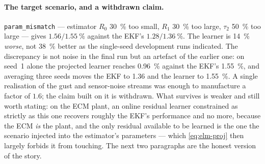 \paragraph{The target scenario, and a withdrawn claim.}  \texttt{param\_mismatch} --- estimator
$R_0$ \SI{30}{\percent} too small, $R_1$ \SI{30}{\percent} too large, $\tau_2$ \SI{50}{\percent} too
large --- gives $1.56/\SI{1.55}{\percent}$ against the EKF's $1.28/\SI{1.36}{\percent}$.  The
learner is \SI{14}{\percent} \emph{worse}, not \SI{38}{\percent} better as the single-seed
development runs indicated.  The discrepancy is not noise in the final run but an artefact of the
earlier one: on seed~1 alone the projected learner reaches \SI{0.96}{\percent} against the EKF's
\SI{1.55}{\percent}, and averaging three seeds moves the EKF to \SI{1.36}{} and the learner to
\SI{1.55}{\percent}.  A single realisation of the gust and sensor-noise streams was enough to
manufacture a factor of $1.6$; the claim built on it is withdrawn.  What survives is weaker and
still worth stating: on the ECM plant, an online residual learner constrained as strictly as this
one recovers roughly the EKF's performance and no more, because the ECM \emph{is} the plant, and
the only residual available to be learned is the one the scenario injected into the estimator's
parameters --- which \cref{eq:elm-proj} then largely forbids it from touching.  The next two
paragraphs are the honest version of the story.

